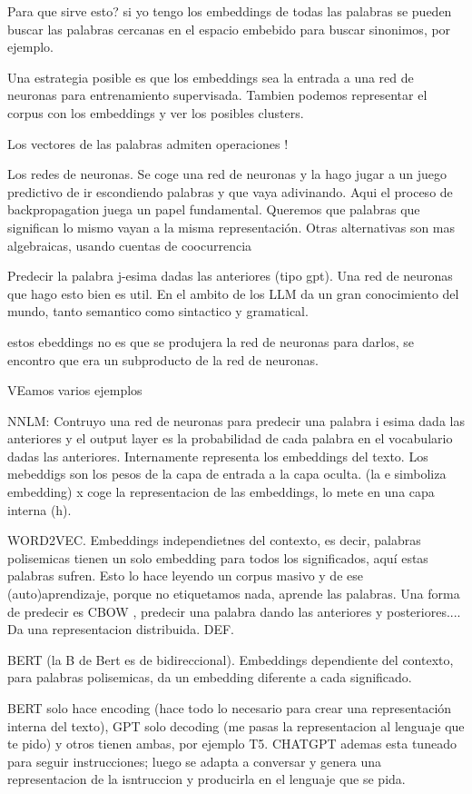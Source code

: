 Para que sirve esto? si yo tengo los embeddings de todas las palabras se pueden buscar las palabras cercanas en el espacio embebido para buscar sinonimos, por ejemplo. 

Una estrategia posible es que los embeddings sea la entrada a una red de neuronas para entrenamiento supervisada. Tambien podemos representar el corpus con los embeddings y ver los posibles clusters. 

Los vectores de las palabras admiten operaciones !

Los redes de neuronas. Se coge una red de neuronas y la hago jugar a un juego predictivo de ir escondiendo palabras y que vaya adivinando. Aqui el proceso de backpropagation juega un papel fundamental. Queremos que palabras que significan lo mismo vayan a la misma representación. Otras alternativas son mas algebraicas, usando cuentas de coocurrencia 


Predecir la palabra j-esima dadas las anteriores (tipo gpt). Una red de neuronas que hago esto bien es util. En el ambito de los LLM da un gran conocimiento del mundo, tanto semantico como sintactico y gramatical. 

estos ebeddings no es que se produjera la red de neuronas para darlos, se encontro que era un subproducto de la red de neuronas.

VEamos varios ejemplos

NNLM: Contruyo una red de neuronas para predecir una palabra i esima dada las anteriores y el output layer es la probabilidad de cada palabra en el vocabulario dadas las anteriores. Internamente representa los embeddings del texto. Los mebeddigs son los pesos de la capa de entrada a la capa oculta. (la e simboliza embedding) x coge la representacion de las embeddings, lo mete en una capa interna (h).


WORD2VEC. Embeddings independietnes del contexto, es decir, palabras polisemicas tienen un solo embedding para todos los significados, aquí estas palabras sufren. Esto lo hace leyendo un corpus masivo y de ese (auto)aprendizaje, porque no etiquetamos nada, aprende las palabras. Una forma de predecir es CBOW , predecir una palabra dando las anteriores y posteriores.... Da una representacion distribuida. DEF. 

BERT (la B de Bert es de bidireccional). Embeddings dependiente del contexto, para palabras polisemicas, da un embedding diferente a cada significado.

BERT solo hace encoding (hace todo lo necesario para crear una representación interna del texto), GPT solo decoding (me pasas la representacion al lenguaje que te pido) y otros tienen ambas, por ejemplo T5. CHATGPT ademas esta tuneado para seguir instrucciones; luego se adapta a conversar y genera una representacion de la isntruccion y producirla en el lenguaje que se pida. 



